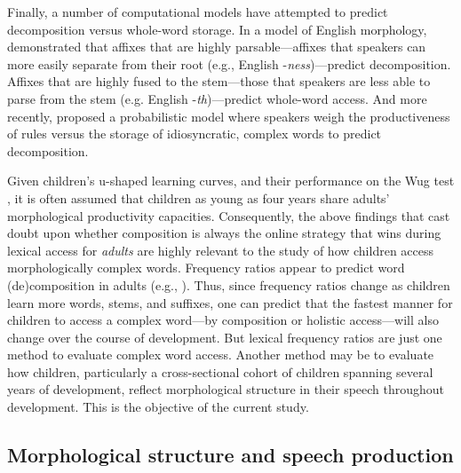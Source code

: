 \documentclass[a4paper,man,floatsintext,natbib,donotrepeattitle, apacite]{apa6}
\begin{document}
Finally, a number of computational models have attempted to predict decomposition versus whole-word storage. In a model of English morphology, \citet{ingoplagSuffixOrderingMorphological2009} demonstrated that affixes that are highly parsable---affixes that speakers can more easily separate from their root (e.g., English -\textit{ness})---predict decomposition. Affixes that are highly fused to the stem---those that speakers are less able to parse from the stem (e.g. English -\textit{th})---predict whole-word access. And more recently, \citet{odonnellProductivityReuseLanguage2015} proposed a probabilistic model where speakers weigh the productiveness of rules versus the storage of idiosyncratic, complex words to predict decomposition. 

Given children's u-shaped learning curves, and their performance on the Wug test \citep{berkoChildLearningEnglish1958}, it is often assumed that children as young as four years share adults' morphological productivity capacities. Consequently, the above findings that cast doubt upon whether composition is always the online strategy that wins during lexical access for \textit{adults} are highly relevant to the study of how children access morphologically complex words. Frequency ratios appear to predict word (de)composition in adults (e.g., \citealt{hayCausesConsequencesWord2003}). Thus, since frequency ratios change as children learn more words, stems, and suffixes, one can predict that the fastest manner for children to access a complex word---by composition or holistic access---will also change over the course of development. But lexical frequency ratios are just one method to evaluate complex word access. Another method may be to evaluate how children, particularly a cross-sectional cohort of children spanning several years of development, reflect morphological structure in their speech throughout development. This is the objective of the current study. 

\subsection{Morphological structure and speech production}
\end{document}
